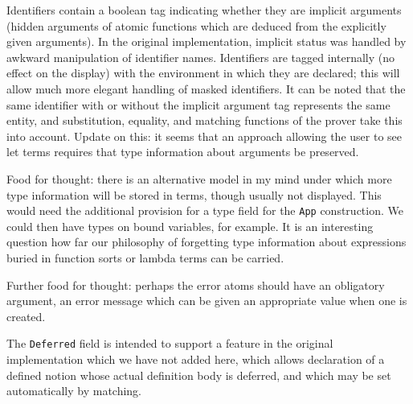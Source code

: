 \documentclass[12pt]{article}
\begin{document}
Identifiers contain a boolean tag indicating whether they are implicit arguments (hidden arguments of atomic functions which are deduced from the explicitly given arguments).  In the original implementation, implicit status was handled by awkward manipulation of identifier names.  Identifiers are tagged internally (no effect on the display) with the environment in which they are declared;  this will allow much more elegant handling of masked identifiers.   It can be noted that the same identifier with or without the implicit argument tag represents the same entity, and substitution, equality, and matching functions of the prover take this into account.  Update on this:  it seems that an approach allowing the user to see let terms requires that type information about arguments be preserved.

Food for thought:  there is an alternative model in my mind under which more type information will be stored in terms, though usually not displayed.
This would need the additional provision for a type field for the {\tt App} construction.  We could then have types on bound variables, for example.  It is an interesting
question how far our philosophy of forgetting type information about expressions buried in function sorts or lambda terms can be carried.

Further food for thought: perhaps the error atoms should have an obligatory argument, an error message which can be given an appropriate value when one is created.

The {\tt Deferred} field is intended to support a feature in the original implementation which we have not added here, which allows declaration of a defined notion whose
actual definition body is deferred, and which may be set automatically by matching.
\end{document}
